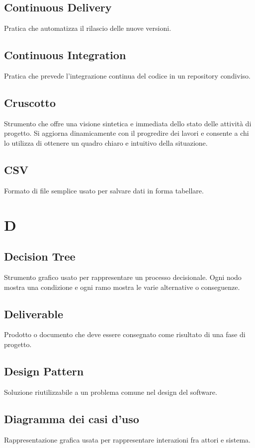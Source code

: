 \documentclass[a4paper,12pt]{article}
\begin{document}
          \subsection*{Continuous Delivery}
			Pratica che automatizza il rilascio delle nuove versioni.
          \subsection*{Continuous Integration}
			Pratica che prevede l'integrazione continua del codice in un repository condiviso.
          \subsection*{Cruscotto}
			Strumento che offre una visione sintetica e immediata dello stato delle attività di progetto. Si aggiorna dinamicamente con il progredire dei lavori e consente a chi lo utilizza di ottenere un quadro chiaro e intuitivo della situazione.
          \subsection*{CSV}
            Formato di file semplice usato per salvare dati in forma tabellare.
      
  \newpage    
        \section{D}
        
          \subsection*{Decision Tree}
			Strumento grafico usato per rappresentare un processo decisionale. Ogni nodo mostra una condizione e ogni ramo mostra le varie alternative o conseguenze.
          \subsection*{Deliverable}
			Prodotto o documento che deve essere consegnato come risultato di una fase di progetto.
          \subsection*{Design Pattern}
			Soluzione riutilizzabile a un problema comune nel design del software.
          \subsection*{Diagramma dei casi d'uso}
			Rappresentazione grafica usata per rappresentare interazioni fra attori e sistema.
\end{document}
